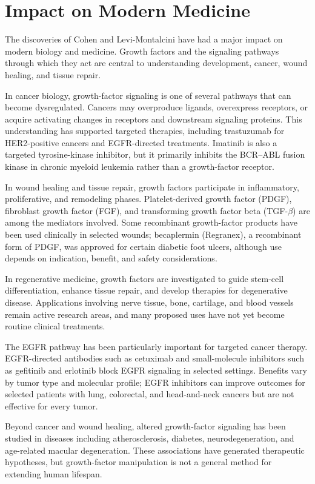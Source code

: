 \section{Impact on Modern Medicine}

The discoveries of Cohen and Levi-Montalcini have had a major impact on modern biology and medicine. Growth factors and the signaling pathways through which they act are central to understanding development, cancer, wound healing, and tissue repair.

In cancer biology, growth-factor signaling is one of several pathways that can become dysregulated. Cancers may overproduce ligands, overexpress receptors, or acquire activating changes in receptors and downstream signaling proteins. This understanding has supported targeted therapies, including trastuzumab for HER2-positive cancers and EGFR-directed treatments. Imatinib is also a targeted tyrosine-kinase inhibitor, but it primarily inhibits the BCR--ABL fusion kinase in chronic myeloid leukemia rather than a growth-factor receptor.

In wound healing and tissue repair, growth factors participate in inflammatory, proliferative, and remodeling phases. Platelet-derived growth factor (PDGF), fibroblast growth factor (FGF), and transforming growth factor beta (TGF-$\beta$) are among the mediators involved. Some recombinant growth-factor products have been used clinically in selected wounds; becaplermin (Regranex), a recombinant form of PDGF, was approved for certain diabetic foot ulcers, although use depends on indication, benefit, and safety considerations.

In regenerative medicine, growth factors are investigated to guide stem-cell differentiation, enhance tissue repair, and develop therapies for degenerative disease. Applications involving nerve tissue, bone, cartilage, and blood vessels remain active research areas, and many proposed uses have not yet become routine clinical treatments.

The EGFR pathway has been particularly important for targeted cancer therapy. EGFR-directed antibodies such as cetuximab and small-molecule inhibitors such as gefitinib and erlotinib block EGFR signaling in selected settings. Benefits vary by tumor type and molecular profile; EGFR inhibitors can improve outcomes for selected patients with lung, colorectal, and head-and-neck cancers but are not effective for every tumor.

Beyond cancer and wound healing, altered growth-factor signaling has been studied in diseases including atherosclerosis, diabetes, neurodegeneration, and age-related macular degeneration. These associations have generated therapeutic hypotheses, but growth-factor manipulation is not a general method for extending human lifespan.

